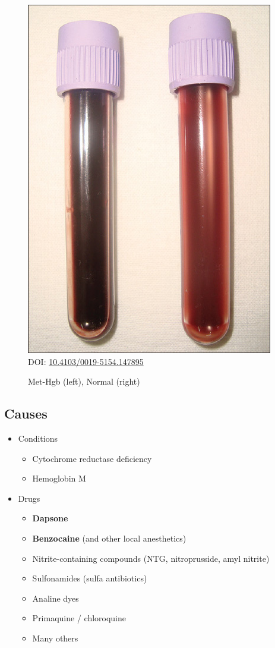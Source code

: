 \documentclass[main.tex]{subfiles}
\begin{document}
\begin{figure}[hbt]
	\centering
	\caption{Met-Hgb (left), Normal (right)}
	\label{img:methgb-picture}
	\includegraphics[width=0.6\linewidth]{img/methemoglobinemia/blood.jpg}\\
	\footnotesize DOI: \href{http://www.e-ijd.org/article.asp?issn=0019-5154;year=2015;volume=60;issue=1;spage=108;epage=108;aulast=Das}{10.4103/0019-5154.147895}
\end{figure}

\subsection{Causes}
	\begin{itemize}[noitemsep]
		\item Conditions
		\begin{itemize}[noitemsep]
			\item Cytochrome  reductase deficiency
			\item Hemoglobin M
		\end{itemize}
		\item Drugs
		\begin{itemize}[noitemsep]
			\item \textbf{Dapsone}
			\item \textbf{Benzocaine} (and other local anesthetics)
			\item Nitrite-containing compounds (NTG, nitroprusside, amyl nitrite)
			\item Sulfonamides (sulfa antibiotics)
			\item Analine dyes
			\item Primaquine / chloroquine
			\item Many others
		\end{itemize}
	\end{itemize}
\end{document}
